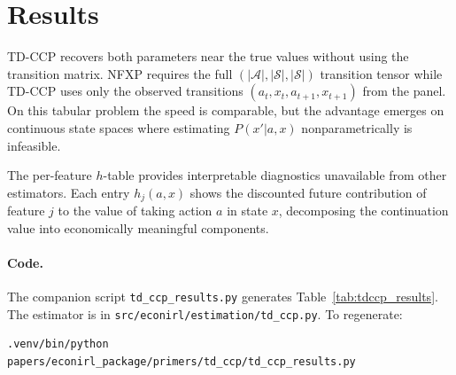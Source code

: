 \documentclass[10pt]{article}
\newcommand{\calA}{\mathcal{A}}
\newcommand{\calS}{\mathcal{S}}
\begin{document}
\section{Results}



TD-CCP recovers both parameters near the true values without using the transition matrix. NFXP requires the full $(|\calA|, |\calS|, |\calS|)$ transition tensor while TD-CCP uses only the observed transitions $(a_t, x_t, a_{t+1}, x_{t+1})$ from the panel. On this tabular problem the speed is comparable, but the advantage emerges on continuous state spaces where estimating $P(x'|a,x)$ nonparametrically is infeasible.

The per-feature $h$-table provides interpretable diagnostics unavailable from other estimators. Each entry $h_j(a,x)$ shows the discounted future contribution of feature $j$ to the value of taking action $a$ in state $x$, decomposing the continuation value into economically meaningful components.

\paragraph{Code.}
The companion script \texttt{td\_ccp\_results.py} generates Table~\ref{tab:tdccp_results}. The estimator is in \texttt{src/econirl/estimation/td\_ccp.py}. To regenerate:
\begin{verbatim}
.venv/bin/python papers/econirl_package/primers/td_ccp/td_ccp_results.py
\end{verbatim}




\end{document}
